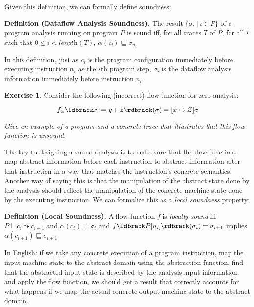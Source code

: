 \documentclass[11pt]{article}
\newcommand{\definition}[2]
  {\bigskip \noindent
   \textbf{Definition (#1).}  #2
   \bigskip
  }
\newcommand{\exercise}[1]
  {\bigskip \noindent
   {\bf Exercise #1}.}
\newcommand{\printanswer}[1]
  {}   %
\newcommand{\answer}[2]
  {\bigskip \printanswer{\noindent
   {\bf Sample Answer #1}. #2 \bigskip}}
\newcommand{\parg}[1] %
  {\ldbrack #1 \rdbrack}
\newcommand{\alap}{\sqsubseteq}
\begin{document}

\noindent Given this definition, we can formally define soundness:

\definition{Dataflow Analysis Soundness}{The result $\{ \sigma_i ~|~ i \in P \}$ of a program analysis running on program $P$ is sound iff, for all traces $T$ of $P$, for all $i$ such that $0 \le i < \textit{length}(T)$, $\alpha(c_i) \alap \sigma_{n_i}$}

In this definition, just as $c_i$ is the program configuration immediately before executing instruction $n_i$ as the $i$th program step, $\sigma_i$ is the dataflow analysis information immediately before instruction $n_i$.




\exercise{1}  Consider the following (incorrect) flow function for zero analysis:

\[
f_Z\parg{x := y + z}(\sigma) = [x \mapsto Z]\sigma
\]

\noindent \emph{Give an example of a program and a concrete trace that illustrates that this flow function is unsound.}

\answer{1}{TODO}


The key to designing a sound analysis is to make sure that the flow functions map abstract information before each instruction to abstract information after that instruction in a way that matches the instruction's concrete semantics.  Another way of saying this is that the manipulation of the abstract state done by the analysis should reflect the  manipulation of the concrete machine state done by the executing instruction.  We can formalize this as a \textit{local soundness} property:

\definition{Local Soundness}{A flow function $f$ is \textit{locally sound} iff $P \vdash c_i \leadsto c_{i+1}$ and $\alpha(c_i) \alap \sigma_i$ and $f\parg{P[n_i]}(\sigma_i) = \sigma_{i+1}$ implies $\alpha(c_{i+1}) \alap \sigma_{i+1}$}

In English: if we take any concrete execution of a program instruction, map the input machine state to the abstract domain using the abstraction function, find that the abstracted input state is described by the analysis input information, and apply the flow function, we should get a result that correctly accounts for what happens if we map the actual concrete output machine state to the abstract domain.
\end{document}
